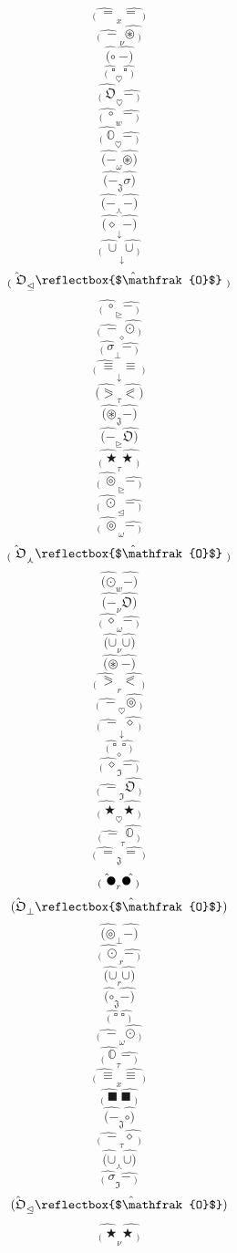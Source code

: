 \documentclass[12pt]{article}
\begin{document}
\begin{multicols}{5}
$$\hat{_( \ =} _x \hat{=\ _)}$$
$$\hat{_( \ -} _\nu \hat{\circledast\ _)}$$
$$\hat{(\circ} \  \hat{-)}$$
$$\hat{_( \ \square} _\heartsuit \hat{\square\ _)}$$
$$\hat{_( \ \mathfrak{O}} _\heartsuit \hat{-\ _)}$$
$$\hat{_( \ \circ} _w \hat{-\ _)}$$
$$\hat{_( \ \mathbb{O}} _\heartsuit \hat{-\ _)}$$
$$\hat{(-} _\omega \hat{\circledast)}$$
$$\hat{(-} _\mathfrak{J} \hat{\sigma)}$$
$$\hat{(-} _\curlywedge \hat{-)}$$
$$\hat{(\diamond} _\downarrow \hat{-)}$$
$$\hat{_( \ \cup} _\downarrow \hat{\cup\ _)}$$
$$\hat{_( \ \mathfrak{O}} _\trianglelefteq \hat{\reflectbox{$\mathfrak{O}$}\ _)}$$
$$\hat{_( \ \circ} _\trianglerighteq \hat{-\ _)}$$
$$\hat{_( \ -} _\diamond \hat{\odot\ _)}$$
$$\hat{_( \ \sigma} _\bot \hat{-\ _)}$$
$$\hat{_( \ \equiv} _\downarrow \hat{\equiv\ _)}$$
$$\hat{(\eqslantgtr} _\tau \hat{\eqslantless)}$$
$$\hat{(\circledast} _\mathfrak{J} \hat{-)}$$
$$\hat{(-} _\trianglerighteq \hat{\mathfrak{O})}$$
$$\hat{_( \ \bigstar} _\tau \hat{\bigstar\ _)}$$
$$\hat{_( \ \circledcirc} _\trianglerighteq \hat{-\ _)}$$
$$\hat{_( \ \odot} _\trianglelefteq \hat{-\ _)}$$
$$\hat{_( \ \circledcirc} _\omega \hat{-\ _)}$$
$$\hat{_( \ \mathfrak{O}} _\curlywedge \hat{\reflectbox{$\mathfrak{O}$}\ _)}$$
$$\hat{(\odot} _w \hat{-)}$$
$$\hat{(-} _\nu \hat{\mathfrak{O})}$$
$$\hat{_( \ \diamond} _\omega \hat{-\ _)}$$
$$\hat{(\cup} _\nu \hat{\cup)}$$
$$\hat{(\circledast} \  \hat{-)}$$
$$\hat{_( \ \eqslantgtr} _r \hat{\eqslantless\ _)}$$
$$\hat{_( \ -} _\heartsuit \hat{\circledcirc\ _)}$$
$$\hat{_( \ -} _\downarrow \hat{\diamond\ _)}$$
$$\hat{_( \ \square} _\diamond \hat{\square\ _)}$$
$$\hat{_( \ \diamond} _\mathfrak{I} \hat{-\ _)}$$
$$\hat{_( \ -} _\mathfrak{I} \hat{\mathfrak{O}\ _)}$$
$$\hat{_( \ \bigstar} _\heartsuit \hat{\bigstar\ _)}$$
$$\hat{_( \ -} _\tau \hat{\mathbb{O}\ _)}$$
$$\hat{_( \ =} _\mathfrak{J} \hat{=\ _)}$$
$$\hat{_( \ \newmoon} _r \hat{\newmoon\ _)}$$
$$\hat{(\mathfrak{O}} _\bot \hat{\reflectbox{$\mathfrak{O}$})}$$
$$\hat{(\circledcirc} _\bot \hat{-)}$$
$$\hat{_( \ \odot} _r \hat{-\ _)}$$
$$\hat{(\cup} _r \hat{\cup)}$$
$$\hat{(\circ} _\mathfrak{J} \hat{-)}$$
$$\hat{_( \ \square} \  \hat{\square\ _)}$$
$$\hat{_( \ -} _\omega \hat{\odot\ _)}$$
$$\hat{_( \ \mathbb{O}} _\tau \hat{-\ _)}$$
$$\hat{_( \ \equiv} _x \hat{\equiv\ _)}$$
$$\hat{_( \ \blacksquare} \  \hat{\blacksquare\ _)}$$
$$\hat{(-} _\mathfrak{J} \hat{\circ)}$$
$$\hat{_( \ -} _\tau \hat{\diamond\ _)}$$
$$\hat{(\cup} _\curlywedge \hat{\cup)}$$
$$\hat{_( \ \sigma} _\mathfrak{I} \hat{-\ _)}$$
$$\hat{(\mathfrak{O}} _\trianglelefteq \hat{\reflectbox{$\mathfrak{O}$})}$$
$$\hat{_( \ \bigstar} _\nu \hat{\bigstar\ _)}$$

\end{multicols}
\end{document}
